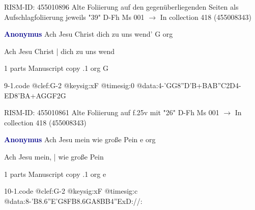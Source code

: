 \documentclass[twocolumn]{book}
\begin{document}
\newline RISM-ID: 455010896
\newline Alte Foliierung auf den gegenüberliegenden Seiten als Aufschlagfoliierung jeweils "39"
\newline D-Fh  Ms 001
\newline $\rightarrow$ In collection 418 (455008343)

\newline \par \vspace{7pt} \textcolor{darkblue}{\textbf{Anonymus  }}
\newline Ach Jesu Christ dich zu uns wend'  G  
\newline org
\newline \begin{itshape}[f.25v, at left:] Ach Jesu Christ | dich zu uns wend\end{itshape} 
\newline \textcolor{darkblue}{}  1 parts  
\newline Manuscript copy
.1  org  G  
\begin{filecontents*}{9-1.code}
@clef:G-2
@keysig:xF
@timesig:0
@data:4-'GG{8''D'B+}{BAB''C}2D4-ED{8'BA+}{AGGF}2G
\end{filecontents*}
\newline
%

\newline RISM-ID: 455010861
\newline Alte Foliierung auf f.25v mit "26"
\newline D-Fh  Ms 001
\newline $\rightarrow$ In collection 418 (455008343)

\newline \par \vspace{7pt} \textcolor{darkblue}{\textbf{Anonymus  }}
\newline Ach Jesu mein wie große Pein  e  
\newline org
\newline \begin{itshape}[f.59v, at left:] Ach Jesu mein, | wie große Pein\end{itshape} 
\newline \textcolor{darkblue}{}  1 parts  
\newline Manuscript copy
.1  org  e  
\begin{filecontents*}{10-1.code}
@clef:G-2
@keysig:xF
@timesig:c
@data:8-{'B8.6''E'G}{8FB8.6GA}{8BB}4''ExD://:
\end{filecontents*}
\newline
%
\end{document}
